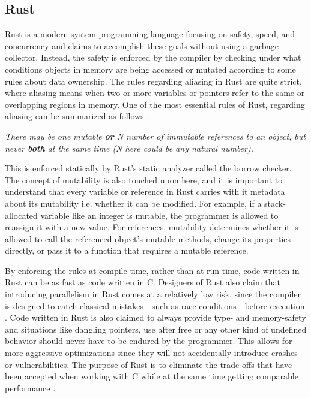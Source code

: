 \subsection{Rust}\label{rust}

Rust is a modern system programming language focusing on safety, speed, and concurrency and claims to accomplish these goals without using a garbage collector. Instead, the safety is enforced by the compiler by checking under what conditions objects in memory are being accessed or mutated according to some rules about data ownership. The rules regarding aliasing in Rust are quite strict, where aliasing means when two or more variables or pointers refer to the same or overlapping regions in memory. One of the most essential rules of Rust, regarding aliasing can be summarized as follows \cite{THERUSTPROGRAMMINGLANGUAGE}:

\textit{There may be one mutable \textbf{or} N number of immutable references to an object, but never \textbf{both} at the same time (N here could be any natural number).}

This is enforced statically by Rust's static analyzer called the borrow checker. The concept of mutability is also touched upon here, and it is important to understand that every variable or reference in Rust carries with it metadata about its mutability i.e. whether it can be modified. For example, if a stack-allocated variable like an integer is mutable, the programmer is allowed to reassign it with a new value. For references, mutability determines whether it is allowed to call the referenced object's mutable methods, change its properties directly, or pass it to a function that requires a mutable reference. 

By enforcing the rules at compile-time, rather than at run-time, code written in Rust can be as fast as code written in C. Designers of Rust also claim that introducing parallelism in Rust comes at a relatively low risk, since the compiler is designed to catch classical mistakes - such as race conditions - before execution \cite{RUSTONOMICON}. Code written in Rust is also claimed to always provide type- and memory-safety and situations like dangling pointers, use after free or any other kind of undefined behavior should never have to be endured by the programmer. This allows for more aggressive optimizations since they will not accidentally introduce crashes or vulnerabilities. The purpose of Rust is to eliminate the trade-offs that have been accepted when working with C while at the same time getting comparable performance \cite{THERUSTPROGRAMMINGLANGUAGE}.

